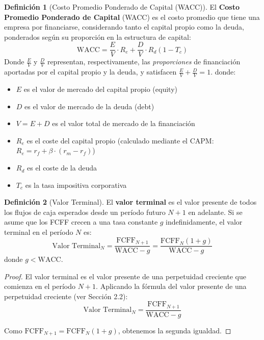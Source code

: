 \documentclass[12pt,a4paper]{article}
\theoremstyle{definition}
\newtheorem{definicion}{Definición}[section]
\begin{document}
\begin{definicion}[Costo Promedio Ponderado de Capital (WACC)]
El \textbf{Costo Promedio Ponderado de Capital} (WACC) es el costo promedio que tiene una empresa por financiarse, considerando tanto el capital propio como la deuda, ponderados según su proporción en la estructura de capital:
\begin{equation}
\text{WACC} = \frac{E}{V} \cdot R_e + \frac{D}{V} \cdot R_d (1 - T_c)
\end{equation}
Donde $\frac{E}{V}$ y $\frac{D}{V}$ representan, respectivamente, las \textit{proporciones} de financiación aportadas por el capital propio y la deuda, y satisfacen $\frac{E}{V} + \frac{D}{V} = 1$.
donde:
\begin{itemize}
\item $E$ es el valor de mercado del capital propio (equity)
\item $D$ es el valor de mercado de la deuda (debt)
\item $V = E + D$ es el valor total de mercado de la financiación
\item $R_e$ es el coste del capital propio (calculado mediante el CAPM: $R_e = r_f + \beta \cdot (r_m - r_f)$)
\item $R_d$ es el coste de la deuda
\item $T_c$ es la tasa impositiva corporativa
\end{itemize}
\end{definicion}

\begin{definicion}[Valor Terminal]
El \textbf{valor terminal} es el valor presente de todos los flujos de caja esperados desde un período futuro $N+1$ en adelante. Si se asume que los FCFF crecen a una tasa constante $g$ indefinidamente, el valor terminal en el período $N$ es:
\begin{equation}
\text{Valor Terminal}_N = \frac{\text{FCFF}_{N+1}}{\text{WACC} - g} = \frac{\text{FCFF}_N (1 + g)}{\text{WACC} - g}
\end{equation}
donde $g < \text{WACC}$.
\end{definicion}

\begin{proof}
El valor terminal es el valor presente de una perpetuidad creciente que comienza en el período $N+1$. Aplicando la fórmula del valor presente de una perpetuidad creciente (ver Sección 2.2):
$$\text{Valor Terminal}_N = \frac{\text{FCFF}_{N+1}}{\text{WACC} - g}$$

Como $\text{FCFF}_{N+1} = \text{FCFF}_N (1 + g)$, obtenemos la segunda igualdad.
\end{proof}
\end{document}
